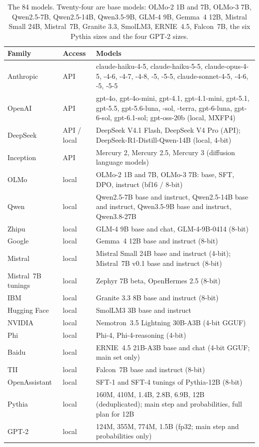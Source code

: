 \documentclass[11pt]{article}
\begin{document}
\begin{table}[t]
\centering
\small
\begin{tabularx}{\linewidth}{@{}l l X@{}}
\toprule
Family & Access & Models \\
\midrule
Anthropic & API & claude-haiku-4-5, claude-haiku-5-5, claude-opus-4-5, -4-6, -4-7, -4-8, -5, -5-5,
claude-sonnet-4-5, -4-6, -5, -5-5 \\
OpenAI & API & gpt-4o, gpt-4o-mini, gpt-4.1, gpt-4.1-mini, gpt-5.1, gpt-5.5, gpt-5.6-luna, -sol, -terra,
gpt-6-luna, gpt-6-sol, gpt-6.1-sol; gpt-oss-20b (local, MXFP4) \\
DeepSeek & API / local & DeepSeek V4.1 Flash, DeepSeek V4 Pro (API); DeepSeek-R1-Distill-Qwen-14B (local, 4-bit) \\
Inception & API & Mercury 2, Mercury 2.5, Mercury 3 (diffusion language models) \\
OLMo & local & OLMo-2 1B and 7B, OLMo-3 7B: base, SFT, DPO, instruct (bf16 / 8-bit) \\
Qwen & local & Qwen2.5-7B base and instruct, Qwen2.5-14B base and instruct, Qwen3.5-9B base and instruct, Qwen3.8-27B \\
Zhipu & local & GLM-4 9B base and chat, GLM-4-9B-0414 (8-bit) \\
Google & local & Gemma~4 12B base and instruct (8-bit) \\
Mistral & local & Mistral Small 24B base and instruct (4-bit); Mistral~7B v0.1 base and instruct (8-bit) \\
Mistral~7B tunings & local & Zephyr 7B beta, OpenHermes 2.5 (8-bit) \\
IBM & local & Granite 3.3 8B base and instruct (8-bit) \\
Hugging Face & local & SmolLM3 3B base and instruct \\
NVIDIA & local & Nemotron~3.5 Lightning 30B-A3B (4-bit GGUF) \\
Phi & local & Phi-4, Phi-4-reasoning (4-bit) \\
Baidu & local & ERNIE~4.5 21B-A3B base and chat (4-bit GGUF; main set only) \\
TII & local & Falcon~7B base and instruct (8-bit) \\
OpenAssistant & local & SFT-1 and SFT-4 tunings of Pythia-12B (8-bit) \\
Pythia & local & 160M, 410M, 1.4B, 2.8B, 6.9B, 12B (deduplicated); main step and probabilities, full plan for 12B \\
GPT-2 & local & 124M, 355M, 774M, 1.5B (fp32; main step and probabilities only) \\
\bottomrule
\end{tabularx}
\caption{The 84 models. Twenty-four are base models: OLMo-2 1B and 7B, OLMo-3 7B, Qwen2.5-7B, Qwen2.5-14B,
Qwen3.5-9B, GLM-4 9B, Gemma~4 12B, Mistral Small 24B, Mistral~7B, Granite 3.3, SmolLM3, ERNIE~4.5, Falcon~7B, the six
Pythia sizes and the four GPT-2 sizes.}
\label{tab:models}
\end{table}
\end{document}
